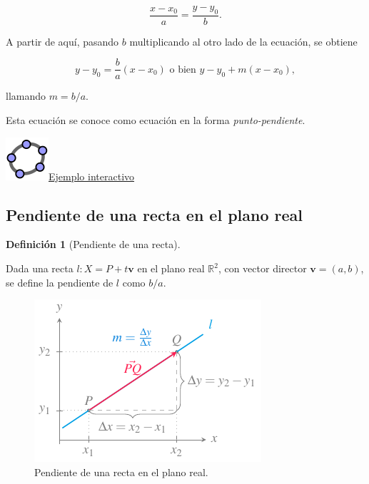\documentclass[
  a4paper,
]{scrreport}
\theoremstyle{definition}
\theoremstyle{plain}
\theoremstyle{plain}
\theoremstyle{plain}
\theoremstyle{definition}
\newtheorem{definition}{Definición}[chapter]
\theoremstyle{remark}
\begin{document}
\[
\frac{x-x_0}{a} = \frac{y-y_0}{b}.
\]

A partir de aquí, pasando \(b\) multiplicando al otro lado de la
ecuación, se obtiene

\[
y-y_0 = \frac{b}{a}(x-x_0) \mbox{ o bien } y-y_0+m(x-x_0),
\]

llamando \(m=b/a\).

Esta ecuación se conoce como ecuación en la forma
\emph{punto-pendiente}.

\href{https://www.geogebra.org/m/JquQZ68R}{\includegraphics{img/logos/logo-geogebra.png}Ejemplo
interactivo}

\hypertarget{pendiente-de-una-recta-en-el-plano-real}{%
\subsection{Pendiente de una recta en el plano
real}\label{pendiente-de-una-recta-en-el-plano-real}}

\begin{definition}[Pendiente de una
recta]\protect\hypertarget{def-pendiente-recta}{}\label{def-pendiente-recta}

Dada una recta \(l: X=P+t\mathbf{v}\) en el plano real \(\mathbb{R}^2\),
con vector director \(\mathbf{v}=(a,b)\), se define la pendiente de
\(l\) como \(b/a\).

\end{definition}

\begin{figure}

{\centering \includegraphics{img/geometria-plano-espacio/pendiente-recta.pdf}

}

\caption{Pendiente de una recta en el plano real.}

\end{figure}
\end{document}
